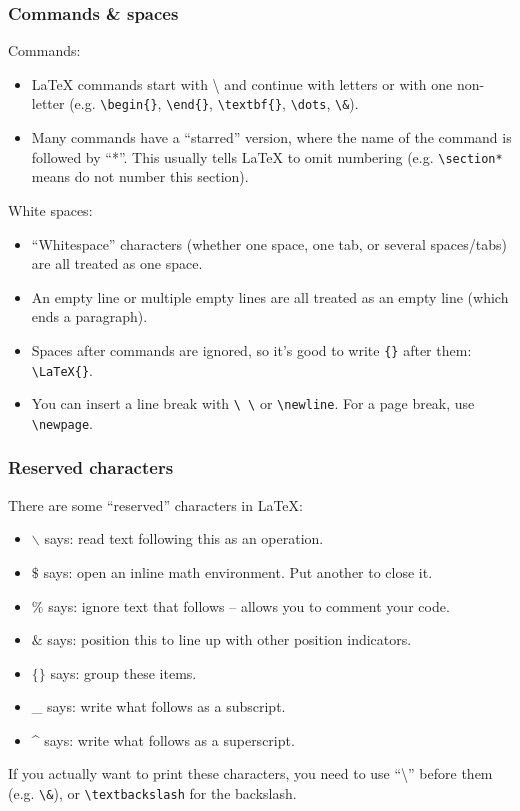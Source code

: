 \documentclass[xcolor=dvipsnames]{beamer} %
\begin{document}
\begin{frame}
  \frametitle{Commands \& spaces}
  Commands:
  \begin{itemize}
    \item \LaTeX{} commands start with \textbackslash{} and continue with letters or
          with one non-letter (e.g. \texttt{\textbackslash begin\{\}}, \texttt{\textbackslash end\{\}}, \texttt{\textbackslash textbf\{\}}, \texttt{\textbackslash dots}, \texttt{\textbackslash \&}).
    \item Many commands have a ``starred'' version, where the name of the
          command is followed by ``*''. This usually tells \LaTeX{} to omit
          numbering (e.g. \texttt{\textbackslash section*} means do not number this section).
  \end{itemize}
  \pause
  White spaces:
  \begin{itemize}
    \item ``Whitespace'' characters (whether one space, one tab, or several
          spaces/tabs) are all treated as one space.
    \item An empty line or multiple
          empty lines are all treated as an empty line (which ends a
          paragraph).
    \item Spaces after commands are ignored, so it's good to write
          \texttt{\{\}} after them: \texttt{\textbackslash LaTeX\{\}}.
    \item You can insert a line break with \texttt{\textbackslash
            \textbackslash} or \texttt{\textbackslash newline}. For a page
          break, use \texttt{\textbackslash newpage}.
  \end{itemize}
\end{frame}

\begin{frame}
  \frametitle{Reserved characters}
  There are some ``reserved'' characters in \LaTeX:
  \begin{itemize}
    \item $\backslash$ says: read text following this as an operation.
    \item $\$ $  says: open an inline math environment. Put another to close it.
    \item $\% $ says: ignore text that follows -- allows you to comment your code.
    \item $\& $ says: position this to line up with other position indicators.
    \item $\{   \}$ says: group these items.
    \item \_{} says: write what follows as a subscript.
    \item \^{} says: write what follows as a superscript.
  \end{itemize}
  If you actually want to print these characters, you need to use
  ``\textbackslash{}'' before them (e.g. \texttt{\textbackslash \&}), or \texttt{\textbackslash textbackslash} for the backslash.
\end{frame}
\end{document}
